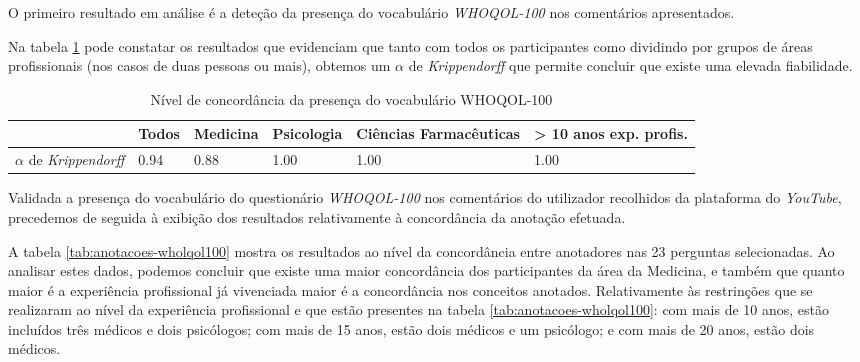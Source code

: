
\par O primeiro resultado em análise é a deteção da presença do vocabulário \textit{WHOQOL-100} nos comentários apresentados. 

\par Na tabela \ref{tab:presenca-wholqol100} pode constatar os resultados que evidenciam que tanto com todos os participantes como dividindo por grupos de áreas profissionais (nos casos de duas pessoas ou mais), obtemos um \begin{math}\alpha\end{math} de \textit{Krippendorff} que permite concluir que existe uma elevada fiabilidade.

\begin{table}[H]
\renewcommand{\arraystretch}{1.1}
\centering
\setlength{\leftmargini}{0.05cm}
\begin{tabular}{|m{2.0cm}|m{2.0cm}|m{2.0cm}|m{2.0cm}|m{2.0cm}|m{2.0cm}|}
\hline
\textbf{}&\textbf{Todos}&\textbf{Medicina}&\textbf{Psicologia}& \textbf{Ciências Farmacêuticas} & \textbf{> 10 anos exp. profis.}\\ \hline

\begin{math}\alpha\end{math} de \textit{Krippendorff} & 0.94 & 0.88 & 1.00 & 1.00 & 1.00\\ \hline
\end{tabular}
\caption{\label{tab:presenca-wholqol100}Nível de concordância da presença do vocabulário WHOQOL-100}
\end{table}

\par Validada a presença do vocabulário do questionário \textit{WHOQOL-100} nos comentários do utilizador recolhidos da plataforma do \textit{YouTube}, precedemos de seguida à exibição dos resultados relativamente à concordância da anotação efetuada. 
\par A tabela \ref{tab:anotacoes-wholqol100} mostra os resultados ao nível da concordância entre anotadores nas 23 perguntas selecionadas. Ao analisar estes dados, podemos concluir que existe uma maior concordância dos participantes da área da Medicina, e também que quanto maior é a experiência profissional já vivenciada maior é a concordância nos conceitos anotados. Relativamente às restrinções que se realizaram ao nível da experiência profissional e que estão presentes na tabela \ref{tab:anotacoes-wholqol100}: com mais de 10 anos, estão incluídos três médicos e dois psicólogos; com mais de 15 anos, estão dois médicos e um psicólogo; e com mais de 20 anos, estão dois médicos.

